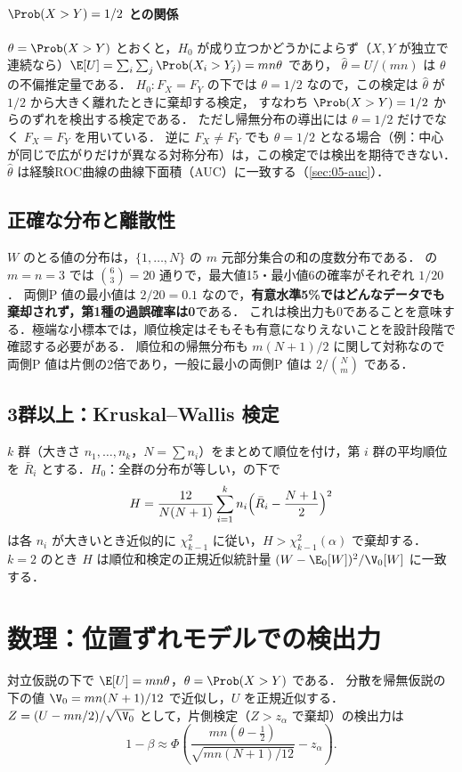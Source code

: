 \paragraph{$\Prob(X>Y)=1/2$ との関係}
$\theta=\Prob(X>Y)$ とおくと，$H_0$ が成り立つかどうかによらず（$X,Y$ が独立で連続なら）$\E[U]=\sum_i\sum_j\Prob(X_i>Y_j)=mn\theta$ であり，
$\hat\theta=U/(mn)$ は $\theta$ の不偏推定量である．
$H_0:F_X=F_Y$ の下では $\theta=1/2$ なので，この検定は $\hat\theta$ が $1/2$ から大きく離れたときに棄却する検定，
すなわち $\Prob(X>Y)=1/2$ からのずれを検出する検定である．
ただし帰無分布の導出には $\theta=1/2$ だけでなく $F_X=F_Y$ を用いている．
逆に $F_X\ne F_Y$ でも $\theta=1/2$ となる場合（例：中心が同じで広がりだけが異なる対称分布）は，この検定では検出を期待できない．
$\hat\theta$ は経験ROC曲線の曲線下面積（AUC）に一致する（\cref{sec:05-auc}）．

\subsection{正確な分布と離散性}\label{subsec:03-exact}
\Youchui $W$ のとる値の分布は，$\{1,\dots,N\}$ の $m$ 元部分集合の和の度数分布である．
 の $m=n=3$ では $\binom63=20$ 通りで，最大値15・最小値6の確率がそれぞれ $1/20$．
両側P 値の最小値は $2/20=0.1$ なので，\textbf{有意水準5\%ではどんなデータでも棄却されず，第1種の過誤確率は0}である．
これは検出力も0であることを意味する．極端な小標本では，順位検定はそもそも有意になりえないことを設計段階で確認する必要がある．
順位和の帰無分布も $m(N+1)/2$ に関して対称なので両側P 値は片側の2倍であり，一般に最小の両側P 値は $2/\binom{N}{m}$ である．

\subsection{3群以上：Kruskal--Wallis 検定}\label{subsec:03-kw}
$k$ 群（大きさ $n_1,\dots,n_k$，$N=\sum n_i$）をまとめて順位を付け，第 $i$ 群の平均順位を $\bar R_i$ とする．$H_0$：全群の分布が等しい，の下で
\begin{equation}
H=\frac{12}{N(N+1)}\sum_{i=1}^kn_i\Bigl(\bar R_i-\frac{N+1}{2}\Bigr)^2\label{eq:03-kw}
\end{equation}
は各 $n_i$ が大きいとき近似的に $\chi^2_{k-1}$ に従い，$H>\chi^2_{k-1}(\alpha)$ で棄却する．
$k=2$ のとき $H$ は順位和検定の正規近似統計量 $(W-\E_0[W])^2/\V_0[W]$ に一致する．

\section{数理：位置ずれモデルでの検出力}\label{sec:03-power}
\Hinshutsu 対立仮説の下で $\E[U]=mn\theta$，$\theta=\Prob(X>Y)$ である．
分散を帰無仮説の下の値 $\V_0=mn(N+1)/12$ で近似し，$U$ を正規近似する．$Z=(U-mn/2)/\sqrt{\V_0}$ として，片側検定（$Z>z_\alpha$ で棄却）の検出力は
\begin{equation}
1-\beta\approx\Phi\!\left(\frac{mn(\theta-\frac12)}{\sqrt{mn(N+1)/12}}-z_\alpha\right).\label{eq:03-power}
\end{equation}
